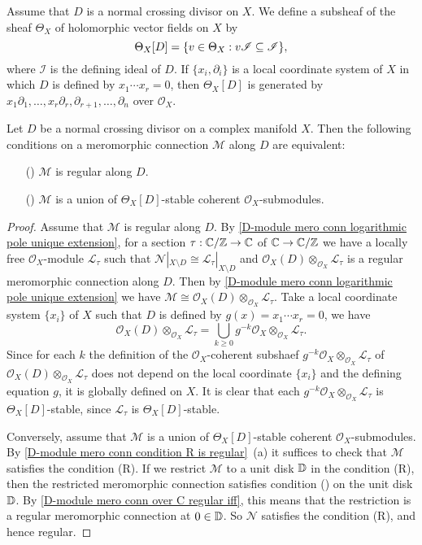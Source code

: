 Assume that $D$ is a normal crossing divisor on $X$. We define a subsheaf of the sheaf $\Theta_X$ of holomorphic vector fields on $X$ by
\[\Theta_X[D]=\{v\in\Theta_X:v\mathscr{I}\subseteq\mathscr{I}\},\]
where $\mathscr{I}$ is the defining ideal of $D$. If $\{x_i,\partial_i\}$ is a local coordinate system of $X$ in which $D$ is defined by $x_1\cdots x_r=0$, then $\Theta_X[D]$ is generated by $x_1\partial_1,\dots,x_r\partial_r,\partial_{r+1},\dots,\partial_n$ over $\mathscr{O}_X$. 

\begin{corollary}\label{D-module mero conn regular iff union of Theta stable submodule}
Let $D$ be a normal crossing divisor on a complex manifold $X$. Then the following conditions on a meromorphic connection $\mathscr{M}$ along $D$ are equivalent:
\begin{enumerate}
    \item[(\rmnum{1})] $\mathscr{M}$ is regular along $D$.
    \item[(\rmnum{2})] $\mathscr{M}$ is a union of $\Theta_X[D]$-stable coherent $\mathscr{O}_X$-submodules.
\end{enumerate}
\end{corollary}
\begin{proof}
Assume that $\mathscr{M}$ is regular along $D$. By \cref{D-module mero conn logarithmic pole unique extension}, for a section $\tau:\mathbb{C}/\mathbb{Z}\to\mathbb{C}$ of $\mathbb{C}\to\mathbb{C}/\mathbb{Z}$ we have a locally free $\mathscr{O}_X$-module $\mathscr{L}_\tau$ such that $\mathscr{N}|_{X\setminus D}\cong\mathscr{L}_\tau|_{X\setminus D}$ and $\mathscr{O}_X(D)\otimes_{\mathscr{O}_X}\mathscr{L}_\tau$ is a regular meromorphic connection along $D$. Then by \cref{D-module mero conn logarithmic pole unique extension} we have $\mathscr{M}\cong\mathscr{O}_X(D)\otimes_{\mathscr{O}_X}\mathscr{L}_\tau$. Take a local coordinate system $\{x_i\}$ of $X$ such that $D$ is defined by $g(x)=x_1\cdots x_r=0$, we have
\[\mathscr{O}_X(D)\otimes_{\mathscr{O}_X}\mathscr{L}_\tau=\bigcup_{k\geq 0}g^{-k}\mathscr{O}_X\otimes_{\mathscr{O}_X}\mathscr{L}_\tau.\]
Since for each $k$ the definition of the $\mathscr{O}_X$-coherent subshaef $g^{-k}\mathscr{O}_X\otimes_{\mathscr{O}_X}\mathscr{L}_\tau$ of $\mathscr{O}_X(D)\otimes_{\mathscr{O}_X}\mathscr{L}_\tau$ does not depend on the local coordinate $\{x_i\}$ and the defining equation $g$, it is globally defined on $X$. It is clear that each $g^{-k}\mathscr{O}_X\otimes_{\mathscr{O}_X}\mathscr{L}_\tau$ is $\Theta_X[D]$-stable, since $\mathscr{L}_\tau$ is $\Theta_X[D]$-stable.\par
Conversely, assume that $\mathscr{M}$ is a union of $\Theta_X[D]$-stable coherent $\mathscr{O}_X$-submodules. By \cref{D-module mero conn condition R is regular}~(a) it suffices to check that $\mathscr{M}$ satisfies the condition (R). If we restrict $\mathscr{M}$ to a unit disk $\mathbb{D}$ in the condition (R), then the restricted meromorphic connection satisfies condition () on the unit disk $\mathbb{D}$. By \cref{D-module mero conn over C regular iff}, this means that the restriction is a regular meromorphic connection at $0\in\mathbb{D}$. So $\mathscr{N}$ satisfies the condition (R), and hence regular.
\end{proof}

